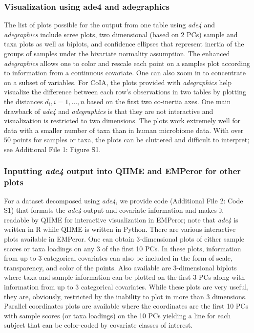 \documentclass[doublespacing]{bmcart}
\begin{document}
\subsubsection*{Visualization using ade4 and adegraphics}
The list of plots possible for the output from one table using {\it ade4} and {\it adegraphics} include scree plots, two dimensional (based on 2 PCs) sample and taxa plots as well as biplots, and confidence ellipses that represent inertia of the groups of samples under the bivariate normality assumption. The enhanced {\it adegraphics} allows one to color and rescale each point on a samples plot according to information from a continuous covariate.  One can also zoom in to concentrate on a subset of variables.  For CoIA, the plots provided with {\it adegraphics} help visualize the difference between each row's observations in two tables by plotting the distances $d_i, i = 1, \dots, n$ based on the first two co-inertia axes. One main drawback of  {\it ade4} and {\it adegraphics} is that they are not interactive and visualization is restricted to two dimensions.   The plots work extremely well for data with a smaller number of taxa than in human microbiome data. With over $50$ points for samples or taxa, the plots can be cluttered and difficult to interpret; see Additional File 1: Figure S1.

\subsubsection*{Inputting {\it ade4} output into QIIME and EMPeror for other plots}
For a dataset decomposed using {\it ade4}, we provide code (Additional File 2: Code S1) that formats the {\it ade4} output and covariate information and makes it readable by QIIME for interactive visualization in EMPeror; note that {\it ade4} is written in R while QIIME is written in Python. There are various interactive plots available in EMPeror.  One can obtain 3-dimensional plots of either sample scores or taxa loadings on any 3 of the first 10 PCs. In these plots, information from up to 3 categorical covariates can also be included in the form of scale, transparency, and color of the points.   Also available are 3-dimensional biplots where taxa and sample information can be plotted on the first 3 PCs along with information from up to 3 categorical covariates.  While these plots are very useful, they are, obviously, restricted by the inability to plot in more than 3 dimensions.  Parallel coordinates plots are available where the coordinates are the first 10 PCs with sample scores (or taxa loadings) on the 10 PCs yielding a line for each subject that can be color-coded by covariate classes of interest.  
 
\end{document}
